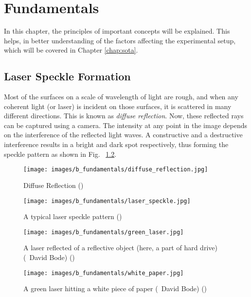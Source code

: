 \chapter{Fundamentals}

In this chapter, the principles of important concepts will be explained. This helps, in better understanding of the factors affecting the experimental setup, which will be covered in Chapter \ref{chap:sota}.

    \section*{Laser Speckle Formation}

    Most of the surfaces on a scale of wavelength of light are rough, and when any coherent light (or laser) is incident on those surfaces, it is scattered in many different directions. This is known as \emph{diffuse reflection}. Now, these reflected rays can be captured using a camera. The intensity at any point in the image depends on the interference of the reflected light waves. A constructive and a destructive interference results in a bright and dark spot respectively, thus forming the speckle pattern as shown in Fig. ~\ref{fig:laser_speckle_pattern}.

    \begin{figure}[h]
            \centering
            \texttt{[image: images/b\_fundamentals/diffuse\_reflection.jpg]}
            \caption{Diffuse Reflection (\cite{img_diffuse})}
            \label{fig:diffuse_reflection}
    \end{figure}

    \begin{figure}[h]
        \centering
        \texttt{[image: images/b\_fundamentals/laser\_speckle.jpg]}
        \caption{A typical laser speckle pattern (\cite{briers})}
        \label{fig:laser_speckle_pattern}
    \end{figure}

    \begin{figure}[h]
        \centering
        \texttt{[image: images/b\_fundamentals/green\_laser.jpg]}
        \caption{A laser reflected of a reflective object (here, a part of hard drive) (\textcopyright \ David Bode) (\cite{img_green_laser})}
        \label{fig:green_laser}
        \end{figure}

    \begin{figure}[h]
        \centering
        \texttt{[image: images/b\_fundamentals/white\_paper.jpg]}
        \caption{A green laser hitting a white piece of paper (\textcopyright \ David Bode) (\cite{img_white_paper})}
        \label{fig:white_paper}
    \end{figure}

